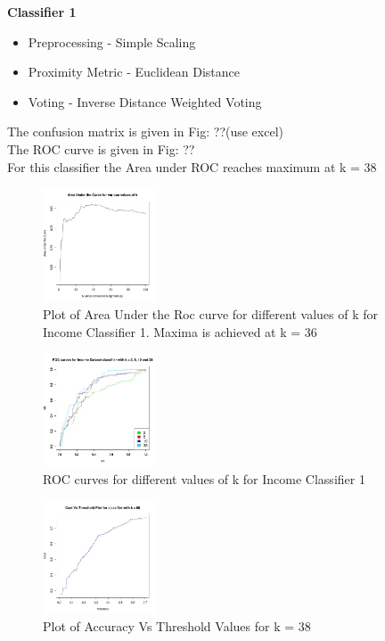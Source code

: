 \textbf{Classifier 1}\\
	\begin{itemize}
		\item Preprocessing - Simple Scaling
		\item Proximity Metric - Euclidean Distance
		\item Voting - Inverse Distance Weighted Voting
	\end{itemize}
	The confusion matrix is given in Fig: ??(use excel)\\
	The ROC curve is given in Fig: ??\\
	For this classifier the Area under ROC reaches maximum at k = 38 \\
	\begin{figure}[h]
		\label{fig:classifier1_auc}
		\caption{Plot of Area Under the Roc curve for different values of k for Income Classifier 1. Maxima is achieved at k = 36}
		\centering
		\includegraphics[width=0.3\textwidth]{images/income_classifier1/auc.jpg}
	\end{figure}	
	\begin{figure}
		\label{fig:classifier1_roc}
		\caption{ROC curves for different values of k for Income Classifier 1}
		\centering
		\includegraphics[width=0.3\textwidth]{images/income_classifier1/roc.jpg}
	\end{figure}
	\begin{figure}
		\label{fig:classifier1_accuracy}
		\caption{Plot of Accuracy Vs Threshold Values for k = 38}
		\centering
		\includegraphics[width=0.3\textwidth]{images/income_classifier1/accuracy.jpg}
	\end{figure}	
	
